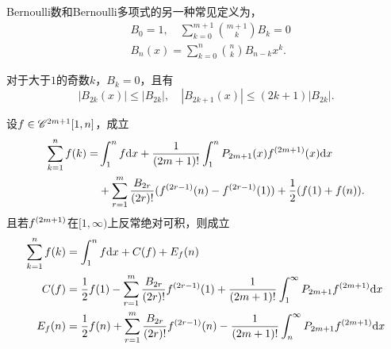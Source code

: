     \begin{thm}[等价定义]
      Bernoulli数和Bernoulli多项式的另一种常见定义为，
      \[\begin{split}
        & B_0 = 1,\quad \sum_{k=0}^{m+1} {{m+1}\choose{k}} B_k = 0 \\
        & B_n(x) = \sum_{k=0}^n{{n}\choose{k}}B_{n-k}x^k.
      \end{split}\]
    \end{thm}
    \remark
      对于大于$1$的奇数$k$，$B_k=0$，且有
      \[
        |B_{2k}(x)| \le |B_{2k}|,\quad
        |B_{2k+1}(x)| \le (2k+1)|B_{2k}|.
      \]

    \begin{thm}[Euler求和公式的一般形式]
      设$\mathnormal{f}\in\mathscr{C}^{2m+1}[1, n]$，成立
      \[\begin{split}
        \sum_{k=1}^n\mathnormal{f}(k) = & \int_1^n\mathnormal{f}\mathrm{d} x +
        \frac{1}{(2m+1)!}\int_1^n P_{2m+1}(x)\mathnormal{f}^{(2m+1)}(x)\mathrm{d} x\\
        & + \sum_{r=1}^m \frac{B_{2r}}{(2r)!}(\mathnormal{f}^{(2r-1)}(n)-\mathnormal{f}^{(2r-1)}(1))
        + \frac{1}{2}(\mathnormal{f}(1) + \mathnormal{f}(n)).
      \end{split}\]
      且若$\mathnormal{f}^{(2m+1)}$在$[1, \infty)$上反常绝对可积，则成立
      \[\begin{split}
      \sum_{k=1}^n\mathnormal{f}(k) &= \int_1^n\mathnormal{f}\mathrm{d} x + C(\mathnormal{f}) + E_{\mathnormal{f}}(n) \\
      C(\mathnormal{f}) &= \frac{1}{2}\mathnormal{f}(1) - \sum_{r=1}^m\frac{B_{2r}}{(2r)!}\mathnormal{f}^{(2r-1)}(1)
      + \frac{1}{(2m+1)!}\int_1^{\infty}P_{2m+1}\mathnormal{f}^{(2m+1)}\mathrm{d} x \\
      E_{\mathnormal{f}}(n) &= \frac{1}{2}\mathnormal{f}(n) + \sum_{r=1}^m\frac{B_{2r}}{(2r)!}\mathnormal{f}^{(2r-1)}(n)
      - \frac{1}{(2m+1)!}\int_n^{\infty}P_{2m+1}\mathnormal{f}^{(2m+1)}\mathrm{d} x
      \end{split}\]
    \end{thm}


